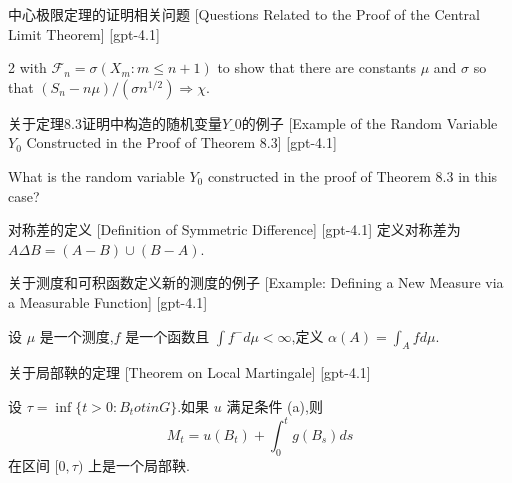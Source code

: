 \documentclass[UTF8]{ctexart}
\begin{document}
    
    
    \begin{thm}
        {中心极限定理的证明相关问题}
        [Questions Related to the Proof of the Central Limit Theorem]
        [gpt-4.1]
        
2 with $\mathcal{F}_{n} = \sigma(X_{m}: m \leq n+1)$ to show that there are constants $\mu$ and $\sigma$ so that $(S_{n} - n\mu)/(\sigma n^{1/2}) \Rightarrow \chi$.

    \end{thm}
    
    
    
    \begin{xmp}
        {关于定理8.3证明中构造的随机变量$Y\_0$的例子}
        [Example of the Random Variable $Y_0$ Constructed in the Proof of Theorem 8.3]
        [gpt-4.1]
        
What is the random variable $Y_{0}$ constructed in the proof of Theorem 8.3 in this case?

    \end{xmp}
    
    
    
    \begin{dfn}
        {对称差的定义}
        [Definition of Symmetric Difference]
        [gpt-4.1]
        定义对称差为 $A \Delta B = ( A - B ) \cup ( B - A )$.
    \end{dfn}
    
    
    
    \begin{xmp}
        {关于测度和可积函数定义新的测度的例子}
        [Example: Defining a New Measure via a Measurable Function]
        [gpt-4.1]
        
设 $\mu$ 是一个测度,$f$ 是一个函数且 $\int f^- d\mu < \infty$,定义 $\alpha(A) = \int_A f d\mu$.

    \end{xmp}
    
    
    
    \begin{thm}
        {关于局部鞅的定理}
        [Theorem on Local Martingale]
        [gpt-4.1]
        
设 $\tau = \inf \{ t > 0 : B_t 
otin G \}$.如果 $u$ 满足条件 (a),则
\[
M_t = u(B_t) + \int_0^t g(B_s) ds
\]
在区间 $[0, \tau)$ 上是一个局部鞅.

    \end{thm}
    
\end{document}
